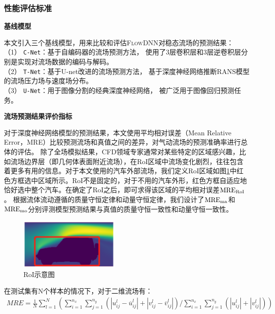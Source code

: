 \subsubsection{性能评估标准}

\textbf{基线模型}

本文引入三个基线模型，用来比较和评估\textsc{FlowDNN}对稳态流场的预测结果：\\
（1） \texttt{C-Net}\cite{DBLP:conf/kdd/GuoLI16}：基于自编码器的流场预测方法，
	使用了3层卷积层和3层逆卷积层分别是实现对流场数据的编码与解码。\\
（2）	\texttt{T-Net}\cite{thuerey2019deep}：基于U-net改进的流场预测方法，
	基于深度神经网络推断RANS模型的流场压力场与速度场分布。\\
（3） \texttt{U-Net}\cite{DBLP:conf/miccai/RonnebergerFB15}：用于图像分割的经典深度神经网络，
	被广泛用于图像回归预测任务。

	




\textbf{流场预测结果评价指标}

对于深度神经网络模型的预测结果，本文使用平均相对误差（Mean Relative Error，MRE）比较预测流场和真值之间的差异，对气动流场的预测准确率进行总体的评估。
除了全场模拟结果，CFD领域专家通常对某些特定的区域感兴趣，比如流场边界层（即几何体表面附近流场），在RoI区域中流场变化剧烈，往往包含着更多有用的信息。对于本文使用的汽车外部流场，我们定义RoI区域如图\ref{fig:errors_area}中红色方框选中区域所示。RoI不是固定的，对于不用的汽车外形，红色方框自适应地恰好选中整个汽车。在确定了RoI之后，即可求得该区域的平均相对误差$\rm{MRE_{RoI}}$。
根据流体流动遵循的质量守恒定律和动量守恒定律，我们设计了${\rm{MRE}_{ma}}$和${\rm{MRE}_{mo}}$分别评测模型预测结果与真值的质量守恒一致性和动量守恒一致性。

\begin{figure}[htp]
	\centering
	\includegraphics[width=0.44\textwidth]{figures/data/data_rep/errors.png}
	\caption{RoI示意图}	
	\label{fig:errors_area}
\end{figure}

在测试集有N个样本的情况下，对于二维流场有：
\begin{align}
MRE = { \frac{1}{N} \sum\limits_{l = 1}^N  \left( {\sum\limits_{i = 1}^{{n_x}} {\sum\limits_{j = 1}^{{n_y}} {\left( {\left| {u_{ij}^l - \overline u _{ij}^l} \right| + \left| {v_{ij}^l - \overline v _{ij}^l} \right|} \right)} } } / {{\sum\limits_{i = 1}^{{n_x}} {\sum\limits_{j = 1}^{{n_y}} {\left( {\left| {u _{ij}^l} \right| + \left| { v _{ij}^l} \right|} \right)} } }} \right) }
\end{align}

